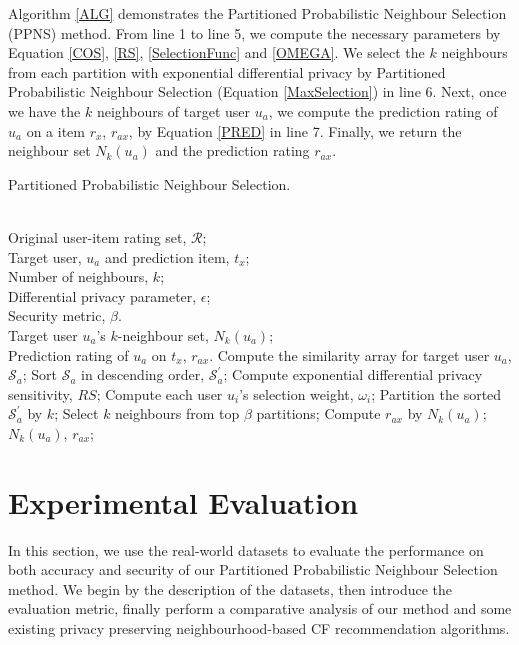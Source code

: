 \documentclass[11pt]{article}
\begin{document}
Algorithm \ref{ALG} demonstrates the Partitioned Probabilistic Neighbour Selection (PPNS) method. From line 1 to line 5, we compute the necessary parameters by Equation \eqref{COS}, \eqref{RS}, \eqref{SelectionFunc} and \eqref{OMEGA}. We select the $k$ neighbours from each partition with exponential differential privacy by Partitioned Probabilistic Neighbour Selection (Equation \eqref{MaxSelection}) in line 6. Next, once we have the $k$ neighbours of target user $u_a$, we compute the prediction rating of $u_a$ on a item $r_x$, $r_{ax}$, by Equation \eqref{PRED} in line 7. Finally, we return the neighbour set $N_{k}(u_a)$ and the prediction rating $r_{ax}$.
\begin{algorithm}[ht]
\caption{Partitioned Probabilistic Neighbour Selection.}
\label{ALG}
\begin{algorithmic}[1]
\REQUIRE ~~\\
Original user-item rating set, $\mathcal{R}$;\\
Target user, $u_a$ and prediction item, $t_x$;\\
Number of neighbours, $k$;\\
Differential privacy parameter, $\epsilon$;\\
Security metric, $\beta$.
\ENSURE ~~\\
Target user $u_a$'s $k$-neighbour set, $N_{k}(u_a)$;\\
Prediction rating of $u_a$ on $t_x$, $r_{ax}$.
\STATE Compute the similarity array for target user $u_a$, $\mathcal{S}_a$;
\STATE Sort $\mathcal{S}_a$ in descending order, $\mathcal{S}_a^\prime$;
\STATE Compute exponential differential privacy sensitivity, $RS$;
\STATE Compute each user $u_i$'s selection weight, $\omega_i$;
\STATE Partition the sorted $\mathcal{S}_a^\prime$ by $k$;
\STATE Select $k$ neighbours from top $\beta$ partitions;
\STATE Compute $r_{ax}$ by $N_{k}(u_a)$;
\RETURN $N_{k}(u_a)$, $r_{ax}$;
\end{algorithmic}
\end{algorithm}


\section{Experimental Evaluation}
\label{PE}
In this section, we use the real-world datasets to evaluate the performance on both accuracy and security of our Partitioned Probabilistic Neighbour Selection method. We begin by the description of the datasets, then introduce the evaluation metric, finally perform a comparative analysis of our method and some existing privacy preserving neighbourhood-based CF recommendation algorithms.
\end{document}
